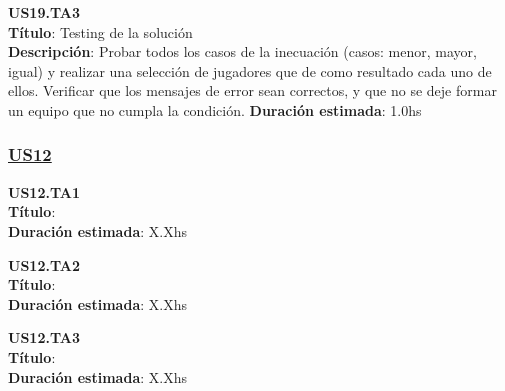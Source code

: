 \begin{tcolorbox}
\textbf{US19.TA3} \\
\textbf{Título}: Testing de la solución \\
\textbf{Descripción}: Probar todos los casos de la inecuación (casos: menor, mayor, igual) y realizar una selección de jugadores que de como resultado cada uno de ellos. Verificar que los mensajes de error sean correctos, y que no se deje formar un equipo que no cumpla la condición.
\textbf{Duración estimada}: 1.0hs
\end{tcolorbox}
\vspace{10pt}


\subsubsection*{\underline{US12}}

\begin{tcolorbox}
\textbf{US12.TA1} \\
\textbf{Título}:  \\
\textbf{Duración estimada}: X.Xhs
\end{tcolorbox}
\vspace{10pt}

\begin{tcolorbox}
\textbf{US12.TA2} \\
\textbf{Título}:  \\
\textbf{Duración estimada}: X.Xhs
\end{tcolorbox}
\vspace{10pt}

\begin{tcolorbox}
\textbf{US12.TA3} \\
\textbf{Título}:  \\
\textbf{Duración estimada}: X.Xhs
\end{tcolorbox}
\vspace{10pt}

